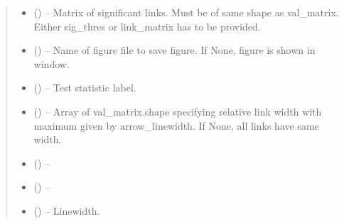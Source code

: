 \documentclass[letterpaper,10pt,english]{sphinxmanual}
\begin{document}
\begin{fulllineitems}
\begin{quote}
\begin{description}
\begin{itemize}
\item {} 
 (\sphinxstyleliteralemphasis{, }\sphinxstyleliteralemphasis{ (}\sphinxstyleliteralemphasis{)}\sphinxstyleliteralemphasis{}) -- Matrix of significant links. Must be of same shape as val\_matrix. Either
sig\_thres or link\_matrix has to be provided.

\item {} 
 (\sphinxstyleliteralemphasis{, }\sphinxstyleliteralemphasis{ (}\sphinxstyleliteralemphasis{)}\sphinxstyleliteralemphasis{}) -- Name of figure file to save figure. If None, figure is shown in window.

\item {} 
 (\sphinxstyleliteralemphasis{, }\sphinxstyleliteralemphasis{ (}\sphinxstyleliteralemphasis{)}\sphinxstyleliteralemphasis{}) -- Test statistic label.

\item {} 
 (\sphinxstyleliteralemphasis{, }\sphinxstyleliteralemphasis{ (}\sphinxstyleliteralemphasis{)}\sphinxstyleliteralemphasis{}) -- Array of val\_matrix.shape specifying relative link width with maximum
given by arrow\_linewidth. If None, all links have same width.

\item {} 
 (\sphinxstyleliteralemphasis{, }\sphinxstyleliteralemphasis{ (}\sphinxstyleliteralemphasis{)}\sphinxstyleliteralemphasis{}) -- 

\item {} 
 () -- 

\item {} 
 (\sphinxstyleliteralemphasis{, }\sphinxstyleliteralemphasis{ (}\sphinxstyleliteralemphasis{)}\sphinxstyleliteralemphasis{}) -- Linewidth.


\end{itemize}
\end{description}
\end{quote}
\end{fulllineitems}
\end{document}
